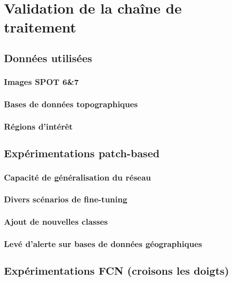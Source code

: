 
\chapter{Validation de la cha\^ine de traitement} %
\PartialToc
\label{Chapter4} %


\section{Donn\'ees utilis\'ees}
\subsection{Images SPOT 6\&7}
\subsection{Bases de donn\'ees topographiques}
\subsection{R\'egions d'int\'er\^et}
\section{Exp\'erimentations patch-based}
\subsection{Capacit\'e de g\'en\'eralisation du r\'eseau}
\subsection{Divers sc\'enarios de fine-tuning}
\subsection{Ajout de nouvelles classes}
\subsection{Lev\'e d'alerte sur bases de donn\'ees g\'eographiques}
\section{Exp\'erimentations FCN (croisons les doigts)}